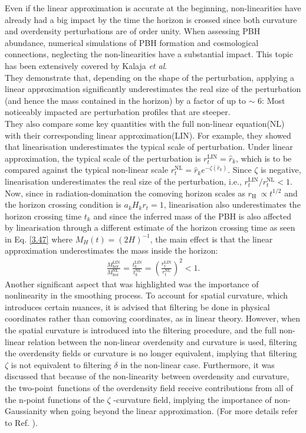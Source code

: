 Even if the linear approximation is accurate at the beginning, non-linearities have already had a big impact by the time the horizon is crossed since both curvature and overdensity perturbations are of order unity. When assessing PBH abundance, numerical simulations of PBH formation and  cosmological connections, neglecting the non-linearities have a substantial impact. This topic has been extensively covered by Kalaja \emph{et al}\cite{Kalaja:2019uju}. \\
They demonstrate that, depending on the shape of the perturbation, applying a linear approximation significantly underestimates the real size of the perturbation (and hence the mass contained in the horizon) by a factor of up to $\sim$ 6: Most noticeably impacted are perturbation profiles that are steeper. \\
They also compare some key quantities with the full non-linear equation(NL)  with their corresponding linear approximation(LIN). For example, they showed that  linearisation underestimates the typical scale of perturbation. Under linear approximation, the typical scale of the perturbation is $r_t^{\mathrm{LIN}}=\hat{r}_k$, which is to be compared against the typical non-linear scale $r_t^{\mathrm{NL}}=\hat{r}_k e^{-\zeta\left(\hat{r}_k\right)}$. Since $\zeta$ is negative, linearisation underestimates the real size of the perturbation, i.e., $r_t^{\mathrm{LIN}} / r_t^{\mathrm{NL}}<1$. \\
Now, since in radiation-domination the comoving horizon scales as $r_{\text {H }} \propto t^{1 / 2}$ and the horizon crossing condition is $a_k H_k r_t=1$, linearisation also underestimates the horizon crossing time $t_k$  and since the inferred mass of the PBH is also affected by linearisation through a different estimate of the horizon crossing time as seen in Eq. \ref{3.47} where $M_{H}(t) = (2H)^{-1}$, the main effect is that the linear approximation underestimates the mass inside the horizon:
\begin{align}
    \frac{M_{\text {hor }}^{\mathrm{LIN}}}{M_{\text {hor }}^{\mathrm{NL}}}=\frac{t_k^{\mathrm{LIN}}}{t_k^{\mathrm{NL}}}=\left(\frac{r_t^{\mathrm{LIN}}}{r_t^{\mathrm{NL}}}\right)^2<1 .\label{3.51}
\end{align}
Another significant aspect that was highlighted was the importance of nonlinearity in the smoothing process.
To account for spatial curvature, which introduces certain nuances, it is advised that filtering be done in physical coordinates rather than comoving coordinates, as in linear theory. However, when the spatial curvature is introduced into the filtering procedure, and the full non-linear relation between the non-linear overdensity and curvature is used, filtering the overdensity fields or curvature is no longer equivalent, implying that filtering $\zeta$ is not equivalent to filtering $\delta$ in the non-linear case. Furthermore, it was discussed that because of the non-linearity between overdensity and curvature, the two-point functions of the overdensity field receive contributions from all of the n-point functions of the $\zeta$ -curvature field, implying the importance of non-Gaussianity when going beyond the linear approximation. (For more details refer to Ref. \cite{Kalaja:2019uju}). 
